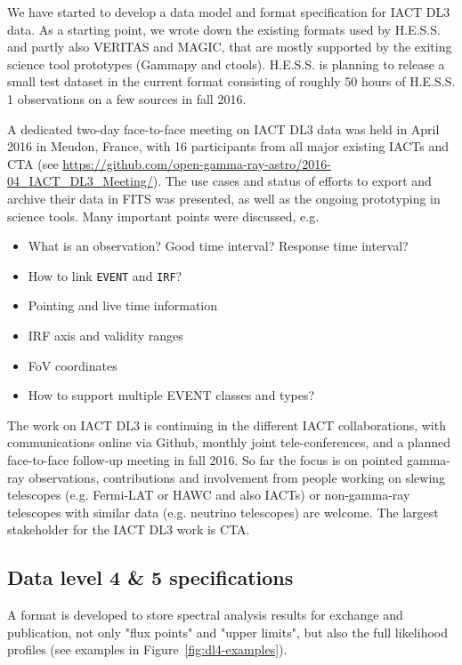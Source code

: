 We have started to develop a data model and format specification for IACT DL3 data. As a starting point, we wrote down the existing formats used by H.E.S.S. and partly also VERITAS and MAGIC, that are mostly supported by the exiting science tool prototypes (Gammapy and ctools). H.E.S.S. is planning to release a small test dataset in the current format consisting of roughly 50 hours of H.E.S.S. 1 observations on a few sources in fall 2016.

A dedicated two-day face-to-face meeting on IACT DL3 data was held in April 2016 in Meudon, France, with 16 participants from all major existing IACTs and CTA (see \url{https://github.com/open-gamma-ray-astro/2016-04_IACT_DL3_Meeting/}). The use cases and status of efforts to export and archive their data in FITS was presented, as well as the ongoing prototyping in science tools. Many important points were discussed, e.g.

\begin{itemize}
\item{}What is an observation? Good time interval? Response time interval?
\item{}How to link \texttt{EVENT} and \texttt{IRF}?
\item{}Pointing and live time information
\item{}IRF axis and validity ranges
\item{}FoV coordinates
\item{}How to support multiple EVENT classes and types?
\end{itemize}

The work on IACT DL3 is continuing in the different IACT collaborations, with communications online via Github, monthly joint tele-conferences, and a planned face-to-face follow-up meeting in fall 2016. So far the focus is on pointed gamma-ray observations, contributions and involvement from people working on slewing telescopes (e.g. Fermi-LAT or HAWC and also IACTs) or non-gamma-ray telescopes with similar data (e.g. neutrino telescopes) are welcome. The largest stakeholder for the IACT DL3 work is CTA.

\subsection{Data level 4 \& 5 specifications}

A format is developed to store spectral analysis results for exchange and publication, not only "flux points" and "upper limits", but also the full likelihood profiles (see examples in Figure~\ref{fig:dl4-examples}).


